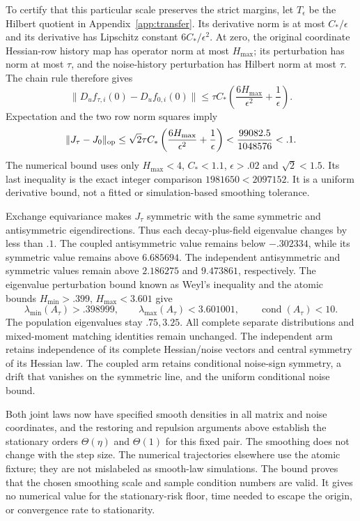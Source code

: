 To certify that this particular scale preserves the strict margins, let
$T_\epsilon$ be the Hilbert quotient in Appendix~\ref{app:transfer}.
Its derivative norm is at most $C_*/\epsilon$ and its derivative has
Lipschitz constant $6C_*/\epsilon^2$. At zero, the original coordinate
Hessian-row history map has operator norm at most $H_{\max}$; its
perturbation has norm at most $\tau$, and the noise-history perturbation
has Hilbert norm at most $\tau$. The chain rule therefore gives
\[
 \|D_uf_{\tau,i}(0)-D_uf_{0,i}(0)\|
 \leq\tau C_*\left(\frac{6H_{\max}}{\epsilon^2}
                                    +\frac1\epsilon\right).
\]
Expectation and the two row norm squares imply
\begin{equation}\label{eq:explicit-smoothing-margin}
 \|J_\tau-J_0\|_{\rm op}
 \leq\sqrt2\tau C_*\left(\frac{6H_{\max}}{\epsilon^2}
                                    +\frac1\epsilon\right)
 <\frac{99082.5}{1048576}<.1.
\end{equation}
The numerical bound uses only $H_{\max}<4$, $C_*<1.1$, $\epsilon>.02$
and $\sqrt2<1.5$. Its last inequality is the exact integer comparison
$1981650<2097152$. It is a uniform derivative bound, not a fitted or
simulation-based smoothing tolerance.

Exchange equivariance makes $J_\tau$ symmetric with the same symmetric
and antisymmetric eigendirections. Thus each decay-plus-field eigenvalue
changes by less than $.1$. The coupled antisymmetric value remains below
$-.302334$, while its symmetric value remains above $6.685694$.
The independent antisymmetric and symmetric values remain above
$2.186275$ and $9.473861$, respectively. The eigenvalue perturbation bound known as Weyl's inequality and the
atomic bounds $H_{\min}>.399$, $H_{\max}<3.601$ give
\[
 \lambda_{\min}(A_\tau)>.398999,\qquad
 \lambda_{\max}(A_\tau)<3.601001,\qquad
 \operatorname{cond}(A_\tau)<10.
\]
The population eigenvalues stay $.75,3.25$. All complete separate distributions and
mixed-moment matching identities remain unchanged. The independent arm retains
independence of its complete Hessian/noise vectors and central symmetry
of its Hessian law. The coupled arm retains conditional noise-sign symmetry, a drift that
vanishes on the symmetric line, and the uniform conditional noise bound.

Both joint laws now have specified smooth densities in all matrix and
noise coordinates,
and the restoring and repulsion arguments above establish the stationary
orders $\Theta(\eta)$ and $\Theta(1)$ for this fixed pair. The smoothing does not change
with the step size. The numerical trajectories elsewhere use the
atomic fixture; they are not mislabeled as smooth-law simulations.
The bound proves that the chosen smoothing scale and sample condition
numbers are valid. It gives no numerical value for the stationary-risk
floor, time needed to escape the origin, or convergence rate to stationarity.
